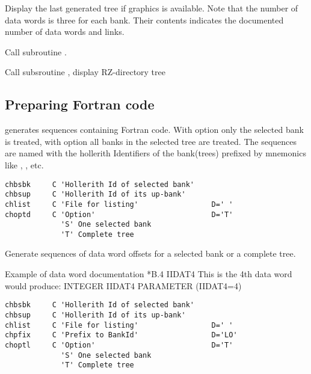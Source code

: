  
Display the last generated tree if graphics is available. 
Note that the number of data words is three for each bank. 
Their
contents indicates the documented number of data words and links.
 
 
Call subroutine .
 
 
Call subsroutine , display RZ-directory tree
 
\newpage

\subsection{Preparing Fortran code}
\label{sec:makecode}
 
 generates   sequences 
containing Fortran code.  
With option  only the selected bank is treated, 
with option  all banks in the selected tree are treated. 
The  sequences are named
with the hollerith Identifiers of the bank(trees) prefixed by mnemonics
like , ,  etc.
 
 
\begin{verbatim}
chbsbk     C 'Hollerith Id of selected bank'
chbsup     C 'Hollerith Id of its up-bank'
chlist     C 'File for listing'                 D=' '
choptd     C 'Option'                           D='T'
             'S' One selected bank
             'T' Complete tree
\end{verbatim}
Generate sequences of data word offsets for a selected bank
or a complete tree.
 
\begin{XMPt}{Example of data word documentation}
         *B.4 IIDAT4     This is the 4th data word
 {\rm would produce:}
         INTEGER IIDAT4
         PARAMETER (IIDAT4=4)
\end{XMPt}
 
 
\begin{verbatim}
chbsbk     C 'Hollerith Id of selected bank'
chbsup     C 'Hollerith Id of its up-bank'
chlist     C 'File for listing'                 D=' '
chpfix     C 'Prefix to BankId'                 D='LO'
choptl     C 'Option'                           D='T'
             'S' One selected bank
             'T' Complete tree
\end{verbatim}
 
